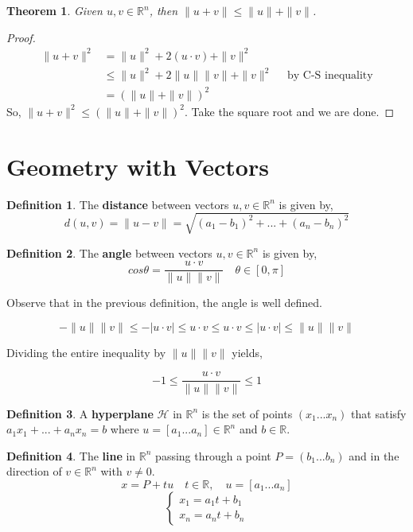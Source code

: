 \documentclass{report}
\newtheorem{_thm}{Theorem}
\theoremstyle{definition}
\newtheorem{_def}{Definition}
\begin{document}
\begin{_thm}
Given \(u,v\in \mathbb{R}^n\), then \(\|u+v\|\leq \|u\|+\|v\|\).
\end{_thm}

\begin{proof}
\begin{align*}
\|u+v\|^2 &= \|u\|^2+2(u\cdot v)+\|v\|^2 \\
&\leq \|u\|^2+2\|u\|\|v\|+\|v\|^2 \quad \text{ by C-S inequality} \\
&= (\|u\|+\|v\|)^2
\end{align*}
So, \(\|u+v\|^2\leq (\|u\|+\|v\|)^2\).
Take the square root and we are done.
\end{proof}

\section{Geometry with Vectors}

\begin{_def}
The \textbf{distance} between vectors \(u,v\in \mathbb{R}^n\) is given by,
\[d(u,v)=\|u-v\|=\sqrt{(a_1-b_1)^2+...+(a_n-b_n)^2}\]
\end{_def}

\begin{_def}
The \textbf{angle} between vectors \(u,v\in \mathbb{R}^n\) is given by,
\[cos\theta =\frac{u\cdot v}{\|u\|\|v\|} \quad \theta \in [0,\pi]\]
\end{_def}

Observe that in the previous definition, the angle is well defined.

\[-\|u\|\|v\|\leq -|u\cdot v|\leq u\cdot v\leq u\cdot v\leq |u\cdot v|\leq \|u\|\|v\|\]

Dividing the entire inequality by $\|u\|\|v\|$ yields,

\[-1\leq \frac{u\cdot v}{\|u\|\|v\|} \leq 1\]

\begin{_def}
A \textbf{hyperplane} $\mathcal{H}$ in $\mathbb{R}^n$ is the set of points $(x_1...x_n)$ that satisfy $a_1x_1+...+a_nx_n=b$ where $u=[a_1...a_n]\in \mathbb{R}^n$ and $b\in \mathbb{R}$.
\end{_def}

\begin{_def}
The \textbf{line} in $\mathbb{R}^n$ passing through a point $P=(b_1...b_n)$ and in the direction of $v\in \mathbb{R}^n$ with $v\neq 0$.
\[x=P+tu \quad t\in \mathbb{R}, \quad u=[a_1...a_n]\]
\[ \left\{ 
  \begin{array}{l}
    x_1=a_1t+b_1 \\
    x_n=a_nt+b_n
  \end{array} \right.\]
\end{_def}
\end{document}

